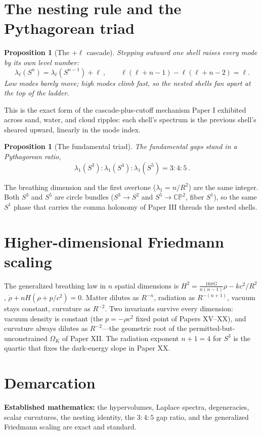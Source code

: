 \documentclass[11pt]{article}
\newtheorem{proposition}[theorem]{Proposition}
\theoremstyle{remark}
\newcommand{\OmK}{\Omega_K}
\begin{document}
\section{The nesting rule and the Pythagorean triad}
\begin{proposition}[The $+\ell$ cascade]
Stepping outward one shell raises every mode by its own level number:
\begin{equation}
\boxed{\ \lambda_\ell(S^n) = \lambda_\ell(S^{n-1}) + \ell\ }, \qquad \ell(\ell+n-1) - \ell(\ell+n-2) = \ell.
\end{equation}
Low modes barely move; high modes climb fast, so the nested shells fan apart at the top of the ladder.
\end{proposition}
This is the exact form of the cascade-plus-cutoff mechanism Paper I exhibited across sand, water, and cloud ripples: each shell's spectrum is the previous shell's sheared upward, linearly in the mode index.
\begin{proposition}[The fundamental triad]
The fundamental gaps stand in a Pythagorean ratio,
\begin{equation}
\boxed{\ \lambda_1(S^3):\lambda_1(S^4):\lambda_1(S^5) = 3:4:5\ }.
\end{equation}
\end{proposition}
The breathing dimension and the first overtone ($\lambda_1 = n/R^2$) are the same integer. Both $S^3$ and $S^5$ are circle bundles ($S^3 \to S^2$ and $S^5 \to \mathbb{CP}^2$, fiber $S^1$), so the same $S^1$ phase that carries the comma holonomy of Paper III threads the nested shells.
\section{Higher-dimensional Friedmann scaling}
The generalized breathing law in $n$ spatial dimensions is $H^2 = \tfrac{16\pi G}{n(n-1)}\rho - kc^2/R^2$, $\dot\rho + nH(\rho + p/c^2) = 0$. Matter dilutes as $R^{-n}$, radiation as $R^{-(n+1)}$, vacuum stays constant, curvature as $R^{-2}$. Two invariants survive every dimension: vacuum density is constant (the $p = -\rho c^2$ fixed point of Papers XV--XX), and curvature always dilutes as $R^{-2}$---the geometric root of the permitted-but-unconstrained $\OmK$ of Paper XII. The radiation exponent $n+1 = 4$ for $S^3$ is the quartic that fixes the dark-energy slope in Paper XX.
\section{Demarcation}
\textbf{Established mathematics:} the hypervolumes, Laplace spectra, degeneracies, scalar curvatures, the nesting identity, the $3{:}4{:}5$ gap ratio, and the generalized Friedmann scaling are exact and standard.
\end{document}
